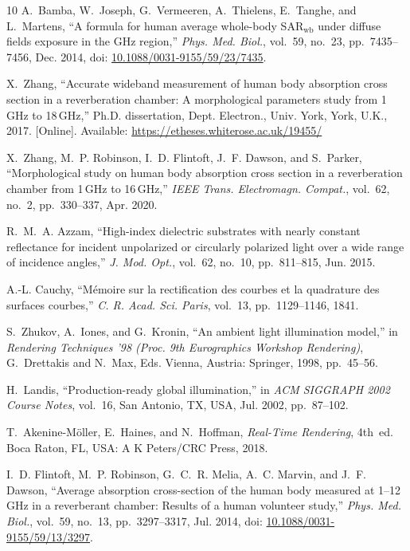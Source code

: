 \documentclass[journal,twocolumn,10pt]{IEEEtran}
\newcommand*{\doi}[1]{\href{https://doi.org/#1}{#1}}
\theoremstyle{plain}
\theoremstyle{remark}
\begin{document}
\begin{thebibliography}{10}
A.~Bamba, W.~Joseph, G.~Vermeeren, A.~Thielens, E.~Tanghe, and L.~Martens,
  ``A formula for human average whole-body SAR$_{\mathrm{wb}}$ under diffuse
  fields exposure in the GHz region,'' \emph{Phys. Med. Biol.}, vol.~59,
  no.~23, pp.~7435--7456, Dec. 2014, doi: \doi{10.1088/0031-9155/59/23/7435}.

X.~Zhang, ``Accurate wideband measurement of human body absorption cross
  section in a reverberation chamber: A morphological parameters study
  from 1\,GHz to 18\,GHz,'' Ph.D. dissertation, Dept. Electron., Univ.
  York, York, U.K., 2017. [Online]. Available:
  \url{https://etheses.whiterose.ac.uk/19455/}

X.~Zhang, M.~P. Robinson, I.~D. Flintoft, J.~F. Dawson, and S.~Parker,
  ``Morphological study on human body absorption cross section in a
  reverberation chamber from 1\,GHz to 16\,GHz,'' \emph{IEEE Trans.
  Electromagn. Compat.}, vol.~62, no.~2, pp.~330--337, Apr. 2020.

R.~M.~A. Azzam, ``High-index dielectric substrates with nearly constant
  reflectance for incident unpolarized or circularly polarized light over
  a wide range of incidence angles,'' \emph{J. Mod. Opt.}, vol.~62,
  no.~10, pp.~811--815, Jun. 2015.

A.-L. Cauchy, ``M\'emoire sur la rectification des courbes et la
  quadrature des surfaces courbes,'' \emph{C. R. Acad. Sci. Paris},
  vol.~13, pp.~1129--1146, 1841.

S.~Zhukov, A.~Iones, and G.~Kronin, ``An ambient light illumination
  model,'' in \emph{Rendering Techniques '98 (Proc. 9th Eurographics
  Workshop Rendering)}, G.~Drettakis and N.~Max, Eds.
  Vienna, Austria: Springer, 1998, pp.~45--56.

H.~Landis, ``Production-ready global illumination,'' in \emph{ACM
  SIGGRAPH 2002 Course Notes}, vol.~16, San Antonio, TX, USA, Jul. 2002,
  pp.~87--102.

T.~Akenine-M{\"o}ller, E.~Haines, and N.~Hoffman, \emph{Real-Time
  Rendering}, 4th~ed. Boca Raton, FL, USA: A K Peters/CRC Press,
  2018.

I.~D. Flintoft, M.~P. Robinson, G.~C.~R. Melia, A.~C. Marvin, and
  J.~F. Dawson, ``Average absorption cross-section of the human body
  measured at 1--12\,GHz in a reverberant chamber: Results of a human
  volunteer study,'' \emph{Phys. Med. Biol.}, vol.~59, no.~13,
  pp.~3297--3317, Jul. 2014, doi: \doi{10.1088/0031-9155/59/13/3297}.


\end{thebibliography}
\end{document}
